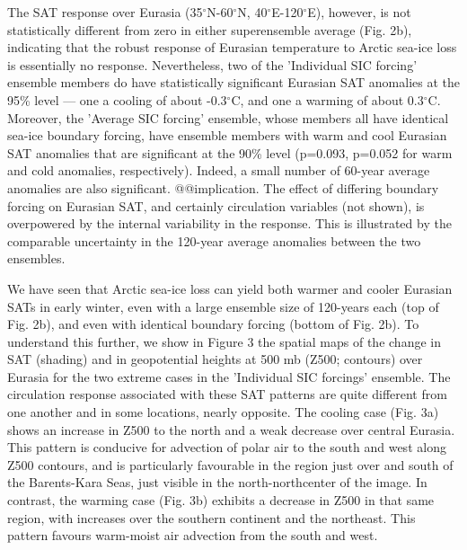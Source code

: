 \documentclass[grl]{AGUTeX}  %
\begin{document}
\begin{article}
The SAT response over Eurasia (35$^\circ$N-60$^\circ$N, 40$^\circ$E-120$^\circ$E), however, is not statistically different from zero in either superensemble average (Fig. 2b), indicating that the robust response of Eurasian temperature to Arctic sea-ice loss is essentially no response. Nevertheless, two of the 'Individual SIC forcing' ensemble members do have statistically significant Eurasian SAT anomalies at the 95\% level --- one a cooling of about -0.3$^\circ$C, and one a warming of about 0.3$^\circ$C. Moreover, the 'Average SIC forcing' ensemble, whose members all have identical sea-ice boundary forcing, have ensemble members with warm and cool Eurasian SAT anomalies that are significant at the 90\% level (p=0.093, p=0.052 for warm and cold anomalies, respectively). Indeed, a small number of 60-year average anomalies are also significant. @@implication. The effect of differing boundary forcing on Eurasian SAT, and certainly circulation variables (not shown), is overpowered by the internal variability in the response. This is illustrated by the comparable uncertainty in the 120-year average anomalies between the two ensembles. %

We have seen that Arctic sea-ice loss can yield both warmer and cooler Eurasian SATs in early winter, even with a large ensemble size of 120-years each (top of Fig. 2b), and even with identical boundary forcing (bottom of Fig. 2b). To understand this further, we show in Figure 3 the spatial maps of the change in SAT (shading) and in geopotential heights at 500 mb (Z500; contours) over Eurasia for the two extreme cases in the 'Individual SIC forcings' ensemble. The circulation response associated with these SAT patterns are quite different from one another and in some locations, nearly opposite. The cooling case (Fig. 3a) shows an increase in Z500 to the north and a weak decrease over central Eurasia. This pattern is conducive for advection of polar air to the south and west along Z500 contours, and is particularly favourable in the region just over and south of the Barents-Kara Seas, just visible in the north-northcenter of the image. In contrast, the warming case (Fig. 3b) exhibits a decrease in Z500 in that same region, with increases over the southern continent and the northeast. This pattern favours warm-moist air advection from the south and west. %


\end{article}
\end{document}
